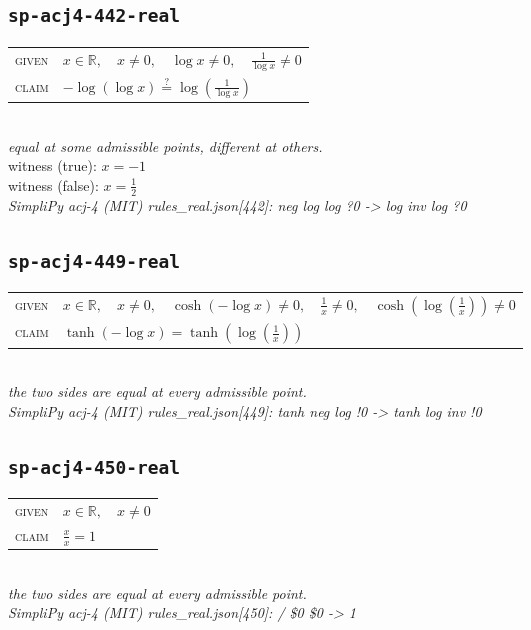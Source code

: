 \documentclass[11pt]{article}
\begin{document}
\subsection*{\texttt{sp-acj4-442-real}}
\begin{tabular}{@{}l@{\quad}l@{}}
\textsc{given} & $x \in \mathbb{R},\quad x \neq 0,\quad \log x \neq 0,\quad \frac{1}{\log x} \neq 0$ \\[4pt]
\textsc{claim} & $\displaystyle -\log\left(\log x\right) \overset{?}{=} \log\left(\frac{1}{\log x}\right)$ \\
\end{tabular}\\[2pt]
{\small\emph{equal at some admissible points, different at others.}}\\
{\footnotesize\color{gray}witness (true): $x = -1$}\\
{\footnotesize\color{gray}witness (false): $x = \frac{1}{2}$}\\
\emph{SimpliPy acj-4 (MIT) rules\_real.json[442]: neg log log ?0  ->  log inv log ?0}\\

\subsection*{\texttt{sp-acj4-449-real}}
\begin{tabular}{@{}l@{\quad}l@{}}
\textsc{given} & $x \in \mathbb{R},\quad x \neq 0,\quad \cosh\left(-\log x\right) \neq 0,\quad \frac{1}{x} \neq 0,\quad \cosh\left(\log\left(\frac{1}{x}\right)\right) \neq 0$ \\[4pt]
\textsc{claim} & $\displaystyle \tanh\left(-\log x\right) = \tanh\left(\log\left(\frac{1}{x}\right)\right)$ \\
\end{tabular}\\[2pt]
{\small\emph{the two sides are equal at every admissible point.}}\\
\emph{SimpliPy acj-4 (MIT) rules\_real.json[449]: tanh neg log !0  ->  tanh log inv !0}\\

\subsection*{\texttt{sp-acj4-450-real}}
\begin{tabular}{@{}l@{\quad}l@{}}
\textsc{given} & $x \in \mathbb{R},\quad x \neq 0$ \\[4pt]
\textsc{claim} & $\displaystyle \frac{x}{x} = 1$ \\
\end{tabular}\\[2pt]
{\small\emph{the two sides are equal at every admissible point.}}\\
\emph{SimpliPy acj-4 (MIT) rules\_real.json[450]: / \$0 \$0  ->  1}\\
\end{document}
